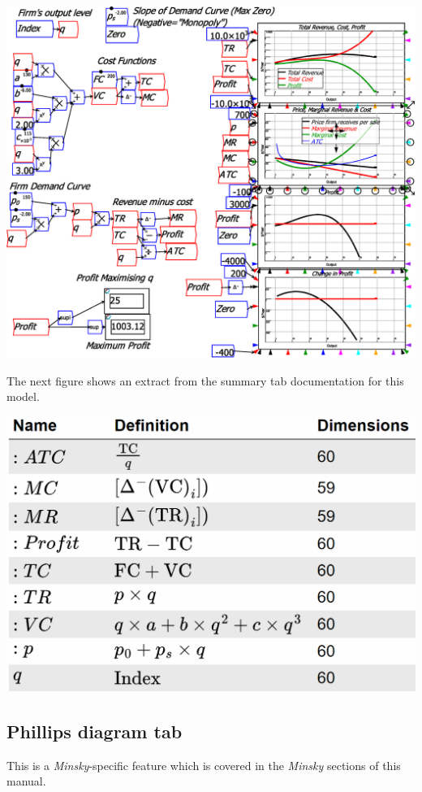 \includegraphics[width=15cm]{images/NeoclassicalModelOfFirm}

The next figure shows an extract from the summary tab documentation
for this model.

\includegraphics[width=15cm]{images/SummaryTabScreenshot}

\subsection{Phillips diagram tab}

\label{tabs:Phillips}

This is a \emph{Minsky}-specific feature which is covered in the \emph{Minsky
}sections of this manual.

